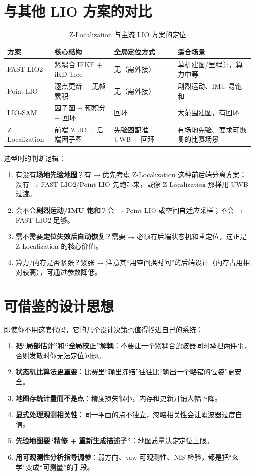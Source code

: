 \section{与其他 LIO 方案的对比}\label{sec:23-compare}

\begin{table}[htbp]
  \centering
  \caption{Z-Localization 与主流 LIO 方案的定位}\label{tab:23-compare}
  \small
  \begin{tabular}{p{2.6cm}p{3.4cm}p{3.2cm}p{4.2cm}}
    \toprule
    方案 & 核心结构 & 全局定位方式 & 适合场景 \\
    \midrule
    FAST-LIO2 & 紧耦合 IEKF + iKD-Tree & 无（需外接） & 单机建图/里程计，算力中等 \\
    Point-LIO & 逐点更新 + 无帧累积 & 无（需外接） & 剧烈运动、IMU 易饱和 \\
    LIO-SAM & 因子图 + 预积分 + 回环 & 回环 & 大范围建图，有回环 \\
    Z-Localization & 前端 ZLIO + 后端因子图 & 先验图配准 + UWB + 回环 & 有场地先验、要求可恢复的比赛场景 \\
    \bottomrule
  \end{tabular}
\end{table}

选型时的判断逻辑：
\begin{enumerate}
  \item 有没有\textbf{场地先验地图}？有 → 优先考虑 Z-Localization 这种前后端分离方案；没有 → FAST-LIO2/Point-LIO 先跑起来，或像 Z-Localization 那样用 UWB 过渡。
  \item 会不会\textbf{剧烈运动/IMU 饱和}？会 → Point-LIO 或空间自适应采样；不会 → FAST-LIO2 足够。
  \item 需不需要\textbf{定位失效后自动恢复}？需要 → 必须有后端状态机和重定位，这正是 Z-Localization 的核心价值。
  \item 算力/内存是否紧张？紧张 → 注意其“用空间换时间”的后端设计（内存占用相对较高），可通过参数降低。
\end{enumerate}

\section{可借鉴的设计思想}\label{sec:23-lessons}

即使你不用这套代码，它的几个设计决策也值得抄进自己的系统：
\begin{enumerate}
  \item \textbf{把“局部估计”和“全局校正”解耦}：不要让一个紧耦合滤波器同时承担两件事，否则发散时你无法定位问题。
  \item \textbf{状态机比算法更重要}：比赛里“输出冻结”往往比“输出一个略错的位姿”更安全。
  \item \textbf{地图存统计量而不是点}：精度损失很小，内存和更新开销大幅下降。
  \item \textbf{显式处理观测相关性}：同一平面的点不独立，忽略相关性会让滤波器过度自信。
  \item \textbf{先验地图要“精修 + 重新生成描述子”}：地图质量决定定位上限。
  \item \textbf{用可观测性分析指导调参}：弱方向、yaw 可观测性、NIS 检验，都是把“玄学”变成“可测量”的手段。
\end{enumerate}

